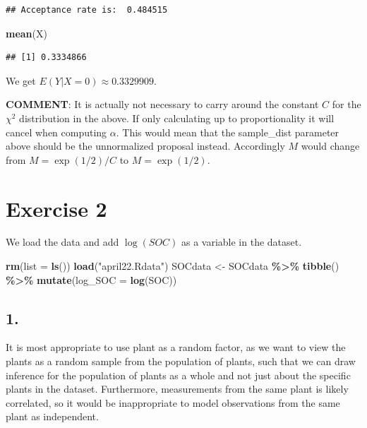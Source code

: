 \documentclass[
]{article}
\newenvironment{Shaded}{\begin{snugshade}}{\end{snugshade}}
\newcommand{\AttributeTok}[1]{\textcolor[rgb]{0.13,0.29,0.53}{#1}}
\newcommand{\FunctionTok}[1]{\textcolor[rgb]{0.13,0.29,0.53}{\textbf{#1}}}
\newcommand{\NormalTok}[1]{#1}
\newcommand{\OtherTok}[1]{\textcolor[rgb]{0.56,0.35,0.01}{#1}}
\newcommand{\SpecialCharTok}[1]{\textcolor[rgb]{0.81,0.36,0.00}{\textbf{#1}}}
\newcommand{\StringTok}[1]{\textcolor[rgb]{0.31,0.60,0.02}{#1}}
\begin{document}
\begin{verbatim}
## Acceptance rate is:  0.484515
\end{verbatim}

\begin{Shaded}
\begin{Highlighting}[]
\FunctionTok{mean}\NormalTok{(X)}
\end{Highlighting}
\end{Shaded}

\begin{verbatim}
## [1] 0.3334866
\end{verbatim}

We get \(E(Y|X = 0) \approx 0.3329909\).

\textbf{COMMENT}: It is actually not necessary to carry around the
constant \(C\) for the \(\chi^2\) distribution in the above. If only
calculating up to proportionality it will cancel when computing
\(\alpha\). This would mean that the sample\_dist parameter above should
be the unnormalized proposal instead. Accordingly \(M\) would change
from \(M = \exp(1/2)/C\) to \(M = \exp(1/2)\).

\hypertarget{exercise-2}{%
\section{Exercise 2}\label{exercise-2}}

We load the data and add \(\log(SOC)\) as a variable in the dataset.

\begin{Shaded}
\begin{Highlighting}[]
\FunctionTok{rm}\NormalTok{(}\AttributeTok{list =} \FunctionTok{ls}\NormalTok{())}
\FunctionTok{load}\NormalTok{(}\StringTok{"april22.Rdata"}\NormalTok{)}
\NormalTok{SOCdata }\OtherTok{\textless{}{-}}\NormalTok{ SOCdata }\SpecialCharTok{\%\textgreater{}\%} \FunctionTok{tibble}\NormalTok{() }\SpecialCharTok{\%\textgreater{}\%} \FunctionTok{mutate}\NormalTok{(}\AttributeTok{log\_SOC =} \FunctionTok{log}\NormalTok{(SOC))}
\end{Highlighting}
\end{Shaded}

\hypertarget{section-4}{%
\subsection{1.}\label{section-4}}

It is most appropriate to use plant as a random factor, as we want to
view the plants as a random sample from the population of plants, such
that we can draw inference for the population of plants as a whole and
not just about the specific plants in the dataset. Furthermore,
measurements from the same plant is likely correlated, so it would be
inappropriate to model observations from the same plant as independent.
\end{document}
